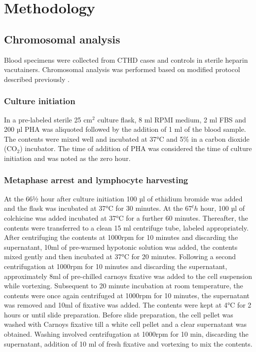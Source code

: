 \section{Methodology}

\subsection{Chromosomal analysis} 
Blood specimens were collected from CTHD cases and controls in sterile heparin vacutainers.
Chromosomal analysis was performed based on modified protocol described previously \cite{barch1997agt,moorhead1960chromosome,babu1995human,haines2005current}.
\subsubsection{Culture initiation}
In a pre-labeled sterile 25 cm$^2$ culture flask, 8 ml RPMI medium, 2 ml FBS and 200 µl PHA was aliquoted followed by the addition of 1 ml of the blood sample. The contents were mixed well and incubated at 37°C and 5\% in a carbon dioxide (CO$_2$) incubator. The time of addition of PHA was considered the time of culture initiation and was noted as the zero hour.
\subsubsection{Metaphase arrest and lymphocyte harvesting}
At the 66½ hour after culture initiation 100 µl of ethidium bromide was added and the flask was incubated at 37°C for 30 minutes. At the 67$^th$ hour, 100 µl of colchicine was added incubated at 37°C for a further 60 minutes. Thereafter, the contents were transferred to a clean 15 ml centrifuge tube, labeled appropriately. After centrifuging the contents at 1000rpm for 10 minutes and discarding the supernatant, 10ml of pre-warmed hypotonic solution was added, the contents mixed gently and then incubated at 37°C for 20 minutes. Following a second centrifugation at 1000rpm for 10 minutes and discarding the supernatant, approximately 8ml of pre-chilled carnoys fixative was added to the cell suspension while vortexing. Subsequent to 20 minute incubation at room temperature, the contents were once again centrifuged at 1000rpm for 10 minutes, the supernatant was removed and 10ml of fixative was added. The contents were kept at 4°C for 2 hours or until slide preparation. Before slide preparation, the cell pellet was washed with Carnoys fixative till a white cell pellet and a clear supernatant was obtained. Washing involved centrifugation at 1000rpm for 10 min, discarding the supernatant, addition of 10 ml of fresh fixative and vortexing to mix the contents.
